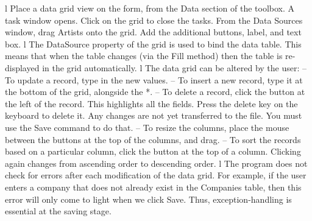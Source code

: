l	Place a data grid view on the form, from the Data section of the toolbox. A task window opens. Click on the grid to close the tasks. From the Data Sources window, drag Artists onto the grid. Add the additional buttons, label, and text box.
l	The DataSource property of the grid is used to bind the data table. This means that when the table changes (via the Fill method) then the table is re-displayed 
in the grid automatically.
l	The data grid can be altered by the user:
	–	To update a record, type in the new values.
	–	To insert a new record, type it at the bottom of the grid, alongside the *.
	–	To delete a record, click the button at the left of the record. This highlights all the ﬁelds. Press the delete key on the keyboard to delete it. Any changes are 
not yet transferred to the ﬁle. You must use the Save command to do that.
	–	To resize the columns, place the mouse between the buttons at the top of the columns, and drag.
	–	To sort the records based on a particular column, click the button at the top of a column. Clicking again changes from ascending order to descending order.
l	The program does not check for errors after each modiﬁcation of the data grid. For example, if the user enters a company that does not already exist in the Companies table, then this error will only come to light when we click Save. Thus, exception-handling is essential at the saving stage.

